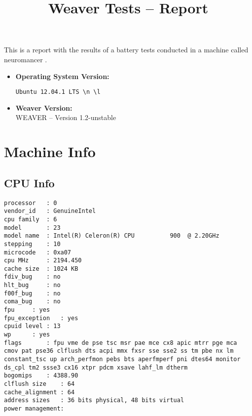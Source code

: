\documentclass{article}
\title{Weaver Tests -- Report}
\begin{document}
\maketitle
This is a report with the results of a battery
tests conducted in a machine called 
neuromancer
.
\begin{itemize}
\item
\textbf{Operating System Version: }
\begin{verbatim}
Ubuntu 12.04.1 LTS \n \l

\end{verbatim}
\item
\textbf{Weaver Version: }\\
WEAVER -- Version 1.2-unstable
\end{itemize}
\section{Machine Info}
\subsection{CPU Info}
\begin{verbatim}
processor	: 0
vendor_id	: GenuineIntel
cpu family	: 6
model		: 23
model name	: Intel(R) Celeron(R) CPU          900  @ 2.20GHz
stepping	: 10
microcode	: 0xa07
cpu MHz		: 2194.450
cache size	: 1024 KB
fdiv_bug	: no
hlt_bug		: no
f00f_bug	: no
coma_bug	: no
fpu		: yes
fpu_exception	: yes
cpuid level	: 13
wp		: yes
flags		: fpu vme de pse tsc msr pae mce cx8 apic mtrr pge mca cmov pat pse36 clflush dts acpi mmx fxsr sse sse2 ss tm pbe nx lm constant_tsc up arch_perfmon pebs bts aperfmperf pni dtes64 monitor ds_cpl tm2 ssse3 cx16 xtpr pdcm xsave lahf_lm dtherm
bogomips	: 4388.90
clflush size	: 64
cache_alignment	: 64
address sizes	: 36 bits physical, 48 bits virtual
power management:

\end{verbatim}
\end{document}
